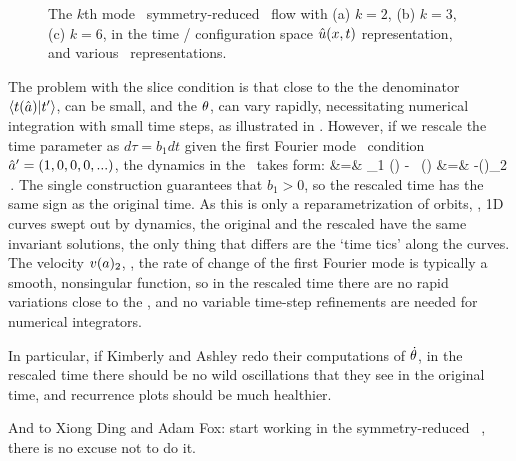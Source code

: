 \begin{figure}%
\centering
\caption{
The $k$th mode \slicePlane\ symmetry-reduced \KS\ flow with
(a)  $k=2$,
(b) $k=3$,
(c) $k=6$,
in the time / configuration space $\hat{u}(x,t)$ representation,
and
various \statesp\ representations.
}
\label{fig:BBKShigherFmode}
\end{figure}



The problem with the slice condition is that close to the {\chartBord}
the denominator $\braket{\groupTan(\sspRed)}{\sliceTan{}}$, can be small,
and the {\phaseVel} ${\theta}$, can vary rapidly, necessitating
numerical integration with small time steps, as illustrated in
. However, if we rescale the time parameter as
$d\tau = b_1 dt$
given the first Fourier mode \slice\ condition $\hat{a}'
= (1,0,0,0,...)$, the dynamics  in the \slice\ takes
form:
\bea
{} &=& \sspRed_1 \vel(\sspRed)
   -  \, \groupTan(\sspRed)
\continue
{} &=& -\vel(\sspRed)_2
\,.
\label{eq:scaledtime}
\eea
The single {\slicePlane} construction guarantees that $b_1>0$, so the
rescaled time has the same sign as the original time. As this is only a
reparametrization of orbits, \ie, 1D curves swept out by dynamics, the
original  and the rescaled 
have the same invariant solutions, the only thing that differs are the
`time tics' along the curves. The velocity $v(a)_2$, \ie, the rate
of change of the first Fourier mode is typically a smooth, nonsingular
function, so in the rescaled time there are no rapid  {\phaseVel}
variations close to the {\chartBord}, and no variable time-step
refinements are needed for numerical integrators.

In particular, if Kimberly and Ashley redo their computations of
$\dot{\theta}$, in the rescaled time there should be no wild
oscillations that they see in the original time, and recurrence plots
should be much healthier.

And to Xiong Ding and Adam Fox: start working in the symmetry-reduced
\KS\ \statesp, there is no excuse not to do it.



